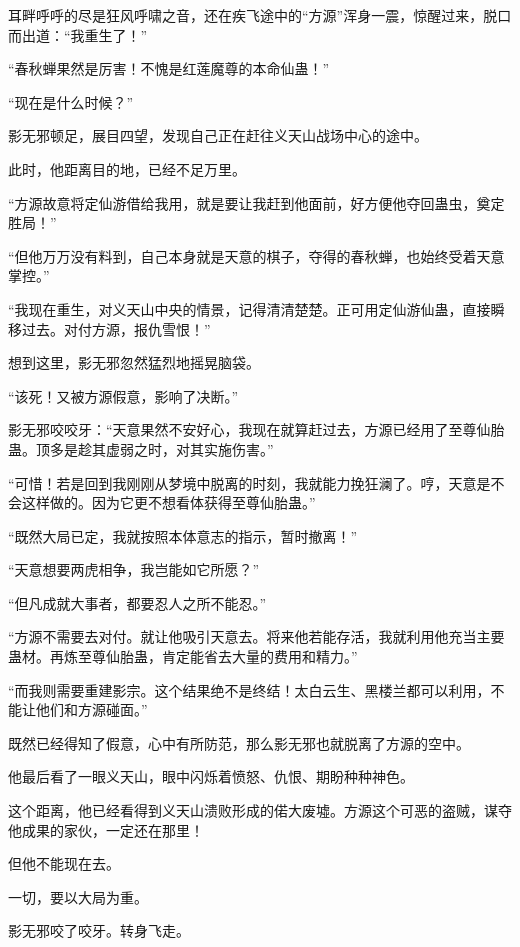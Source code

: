 
\begin{this_body}

耳畔呼呼的尽是狂风呼啸之音，还在疾飞途中的“方源”浑身一震，惊醒过来，脱口而出道：“我重生了！”

“春秋蝉果然是厉害！不愧是红莲魔尊的本命仙蛊！”

“现在是什么时候？”

影无邪顿足，展目四望，发现自己正在赶往义天山战场中心的途中。

此时，他距离目的地，已经不足万里。

“方源故意将定仙游借给我用，就是要让我赶到他面前，好方便他夺回蛊虫，奠定胜局！”

“但他万万没有料到，自己本身就是天意的棋子，夺得的春秋蝉，也始终受着天意掌控。”

“我现在重生，对义天山中央的情景，记得清清楚楚。正可用定仙游仙蛊，直接瞬移过去。对付方源，报仇雪恨！”

想到这里，影无邪忽然猛烈地摇晃脑袋。

“该死！又被方源假意，影响了决断。”

影无邪咬咬牙：“天意果然不安好心，我现在就算赶过去，方源已经用了至尊仙胎蛊。顶多是趁其虚弱之时，对其实施伤害。”

“可惜！若是回到我刚刚从梦境中脱离的时刻，我就能力挽狂澜了。哼，天意是不会这样做的。因为它更不想看体获得至尊仙胎蛊。”

“既然大局已定，我就按照本体意志的指示，暂时撤离！”

“天意想要两虎相争，我岂能如它所愿？”

“但凡成就大事者，都要忍人之所不能忍。”

“方源不需要去对付。就让他吸引天意去。将来他若能存活，我就利用他充当主要蛊材。再炼至尊仙胎蛊，肯定能省去大量的费用和精力。”

“而我则需要重建影宗。这个结果绝不是终结！太白云生、黑楼兰都可以利用，不能让他们和方源碰面。”

既然已经得知了假意，心中有所防范，那么影无邪也就脱离了方源的空中。

他最后看了一眼义天山，眼中闪烁着愤怒、仇恨、期盼种种神色。

这个距离，他已经看得到义天山溃败形成的偌大废墟。方源这个可恶的盗贼，谋夺他成果的家伙，一定还在那里！

但他不能现在去。

一切，要以大局为重。

影无邪咬了咬牙。转身飞走。


\end{this_body}
